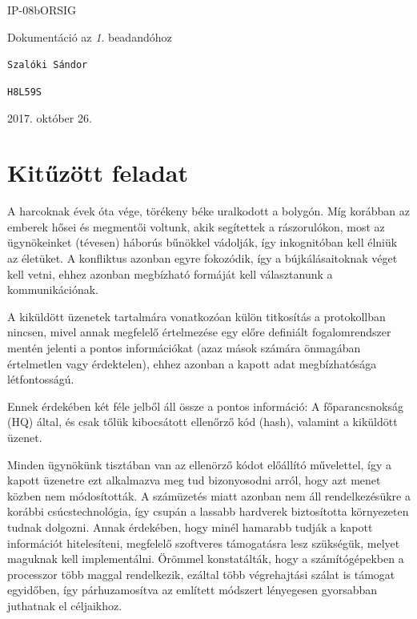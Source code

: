 \documentclass[12pt]{article}
\begin{document}
\begin{titlepage}
	\vspace*{0.5cm}
	{\normalsize IP-08bORSIG}
	
	\vspace{2cm}
	{\huge Dokumentáció az \textit{1}. beadandóhoz}
	
	\vspace*{5cm}
	
	{\large \verb|Szalóki Sándor| } %
	
	{\large \verb|H8L59S| }  %
		
	
	\vfill
	
	\vspace*{1cm}
	2017. október 26. %
\end{titlepage}

\section{Kitűzött feladat}
A harcoknak évek óta vége, törékeny béke uralkodott a bolygón. Míg korábban az emberek hősei és megmentői voltunk, akik segítettek a rászorulókon, most az ügynökeinket (tévesen) háborús bűnökkel vádolják, így inkognitóban kell élniük az életüket. A konfliktus azonban egyre fokozódik, így a bújkálásaitoknak véget kell vetni, ehhez azonban megbízható formáját kell választanunk a kommunikációnak.

A kiküldött üzenetek tartalmára vonatkozóan külön titkosítás a protokollban nincsen, mivel annak megfelelő értelmezése egy előre definiált fogalomrendszer mentén jelenti a pontos információkat (azaz mások számára önmagában értelmetlen vagy érdektelen), ehhez azonban a kapott adat megbízhatósága létfontosságú.

Ennek érdekében két féle jelből áll össze a pontos információ: A főparancsnokság (HQ) által, és csak tőlük kibocsátott ellenőrző kód (hash), valamint a kiküldött üzenet.

Minden ügynökünk tisztában van az ellenörző kódot előállító művelettel, így a kapott üzenetre ezt alkalmazva meg tud bizonyosodni arról, hogy azt menet közben nem módosították. A számüzetés miatt azonban nem áll rendelkezésükre a korábbi csúcstechnológia, így csupán a lassabb hardverek biztosította környezeten tudnak dolgozni. Annak érdekében, hogy minél hamarabb tudják a kapott információt hitelesíteni, megfelelő szoftveres támogatásra lesz szükségük, melyet maguknak kell implementálni. Örömmel konstatálták, hogy a számítógépekben a processzor több maggal rendelkezik, ezáltal több végrehajtási szálat is támogat egyidőben, így párhuzamosítva az említett módszert lényegesen gyorsabban juthatnak el céljaikhoz.
\end{document}
